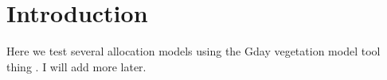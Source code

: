 \chapter{Introduction}

Here we test several allocation models using the Gday vegetation model tool thing \citep{Comins1993,Corbeels2005}. I will add more later.